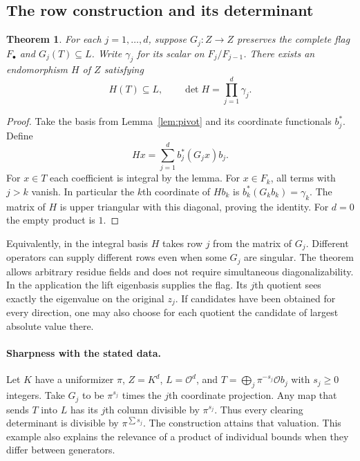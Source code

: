 \documentclass[11pt,letterpaper]{article}
\newtheorem{theorem}{Theorem}[section]
\newcommand{\cO}{\mathcal O}
\begin{document}
\subsection{The row construction and its determinant}
\begin{theorem}\label{thm:rows}
For each $j=1,\ldots,d$, suppose $G_j:Z\to Z$ preserves the complete flag $F_\bullet$ and $G_j(T)\subseteq L$. Write $\gamma_j$ for its scalar on $F_j/F_{j-1}$. There exists an endomorphism $H$ of $Z$ satisfying
\[
                        H(T)\subseteq L,\qquad \det H=\prod_{j=1}^d\gamma_j .
\]
\end{theorem}
\begin{proof}
Take the basis from Lemma~\ref{lem:pivot} and its coordinate functionals $b_j^*$. Define
\[
                         Hx=\sum_{j=1}^d b_j^*(G_jx)b_j .
\]
For $x\in T$ each coefficient is integral by the lemma. For $x\in F_k$, all terms with $j>k$ vanish. In particular the $k$th coordinate of $Hb_k$ is $b_k^*(G_kb_k)=\gamma_k$. The matrix of $H$ is upper triangular with this diagonal, proving the identity. For $d=0$ the empty product is $1$.
\end{proof}

Equivalently, in the integral basis $H$ takes row $j$ from the matrix of $G_j$. Different operators can supply different rows even when some $G_j$ are singular. The theorem allows arbitrary residue fields and does not require simultaneous diagonalizability. In the application the lift eigenbasis supplies the flag. Its $j$th quotient sees exactly the eigenvalue on the original $z_j$. If candidates have been obtained for every direction, one may also choose for each quotient the candidate of largest absolute value there.

\paragraph{Sharpness with the stated data.}
Let $K$ have a uniformizer $\pi$, $Z=K^d$, $L=\cO^d$, and $T=\bigoplus_j\pi^{-s_j}\cO b_j$ with $s_j\ge0$ integers. Take $G_j$ to be $\pi^{s_j}$ times the $j$th coordinate projection. Any map that sends $T$ into $L$ has its $j$th column divisible by $\pi^{s_j}$. Thus every clearing determinant is divisible by $\pi^{\sum s_j}$. The construction attains that valuation. This example also explains the relevance of a product of individual bounds when they differ between generators.
\end{document}
